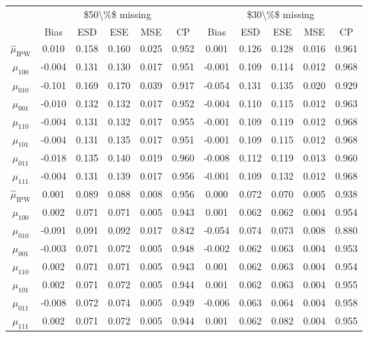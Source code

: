 \documentclass[
]{article}
\begin{document}
\begin{table}[!h]
\centering
\begin{tabular}{ccccccccccc}
\toprule
\multicolumn{1}{c}{} & \multicolumn{5}{c}{\$50\textbackslash{}\%\$ missing} & \multicolumn{5}{c}{\$30\textbackslash{}\%\$ missing} \\
\cmidrule(l{3pt}r{3pt}){2-6} \cmidrule(l{3pt}r{3pt}){7-11}
 & Bias & ESD & ESE & MSE & CP & Bias & ESD & ESE & MSE & CP\\
\midrule
$\hat{\mu}_\text{IPW}$ & 0.010 & 0.158 & 0.160 & 0.025 & 0.952 & 0.001 & 0.126 & 0.128 & 0.016 & 0.961\\
$\hat{\mu}_{100}$ & -0.004 & 0.131 & 0.130 & 0.017 & 0.951 & -0.001 & 0.109 & 0.114 & 0.012 & 0.968\\
$\hat{\mu}_{010}$ & -0.101 & 0.169 & 0.170 & 0.039 & 0.917 & -0.054 & 0.131 & 0.135 & 0.020 & 0.929\\
$\hat{\mu}_{001}$ & -0.010 & 0.132 & 0.132 & 0.017 & 0.952 & -0.004 & 0.110 & 0.115 & 0.012 & 0.963\\
$\hat{\mu}_{110}$ & -0.004 & 0.131 & 0.132 & 0.017 & 0.955 & -0.001 & 0.109 & 0.119 & 0.012 & 0.968\\
$\hat{\mu}_{101}$ & -0.004 & 0.131 & 0.135 & 0.017 & 0.951 & -0.001 & 0.109 & 0.115 & 0.012 & 0.968\\
$\hat{\mu}_{011}$ & -0.018 & 0.135 & 0.140 & 0.019 & 0.960 & -0.008 & 0.112 & 0.119 & 0.013 & 0.960\\
$\hat{\mu}_{111}$ & -0.004 & 0.131 & 0.139 & 0.017 & 0.956 & -0.001 & 0.109 & 0.132 & 0.012 & 0.968\\
$\hat{\mu}_\text{IPW}$ & 0.001 & 0.089 & 0.088 & 0.008 & 0.956 & 0.000 & 0.072 & 0.070 & 0.005 & 0.938\\
$\hat{\mu}_{100}$ & 0.002 & 0.071 & 0.071 & 0.005 & 0.943 & 0.001 & 0.062 & 0.062 & 0.004 & 0.954\\
$\hat{\mu}_{010}$ & -0.091 & 0.091 & 0.092 & 0.017 & 0.842 & -0.054 & 0.074 & 0.073 & 0.008 & 0.880\\
$\hat{\mu}_{001}$ & -0.003 & 0.071 & 0.072 & 0.005 & 0.948 & -0.002 & 0.062 & 0.063 & 0.004 & 0.953\\
$\hat{\mu}_{110}$ & 0.002 & 0.071 & 0.071 & 0.005 & 0.943 & 0.001 & 0.062 & 0.063 & 0.004 & 0.954\\
$\hat{\mu}_{101}$ & 0.002 & 0.071 & 0.072 & 0.005 & 0.944 & 0.001 & 0.062 & 0.063 & 0.004 & 0.955\\
$\hat{\mu}_{011}$ & -0.008 & 0.072 & 0.074 & 0.005 & 0.949 & -0.006 & 0.063 & 0.064 & 0.004 & 0.958\\
$\hat{\mu}_{111}$ & 0.002 & 0.071 & 0.072 & 0.005 & 0.944 & 0.001 & 0.062 & 0.082 & 0.004 & 0.955\\
\bottomrule
\end{tabular}
\end{table}
\end{document}
